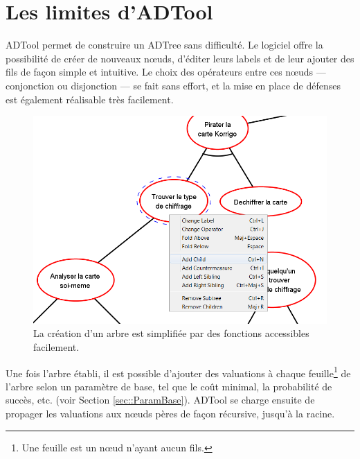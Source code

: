 \section{Les limites d'ADTool}
	\label{sec:adtool}

	ADTool permet de construire un ADTree sans difficulté. Le logiciel offre la possibilité de créer de nouveaux nœuds, d'éditer leurs labels et de leur ajouter des fils de façon simple et intuitive. Le choix des opérateurs entre ces nœuds --- conjonction ou disjonction ---  se fait sans effort, et la mise en place de défenses est également réalisable très facilement. 
	
	\begin{figure}[h]
            \centering
            \includegraphics[width=1\textwidth]{figure/adtool_add_child.png}
            \caption{La création d'un arbre est simplifiée par des fonctions accessibles facilement.}
            \label{fig:arbre_exemple_1}
    \end{figure}
	
	Une fois l'arbre établi, il est possible d'ajouter des valuations à chaque feuille\footnote{Une feuille est un nœud n'ayant aucun fils.} de l'arbre selon un paramètre de base, tel que le coût minimal, la probabilité de succès, etc. (voir Section \ref{sec::ParamBase}). ADTool se charge ensuite de propager les valuations aux nœuds pères de façon récursive, jusqu'à la racine.
	
